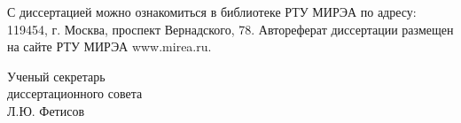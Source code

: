 \vspace{5mm}
\noindent С диссертацией можно ознакомиться в библиотеке РТУ МИРЭА по \linebreak адресу: 119454, г. Москва, проспект Вернадского, 78. Автореферат диссертации  \linebreak размещен на сайте РТУ МИРЭА www.mirea.ru.

\vspace{5mm}

\vspace{5mm}
\noindent Ученый секретарь \\
диссертационного совета
\sfs {} \\
 \hspace{50mm} Л.Ю. Фетисов

\onehalfspacing

\newpage
